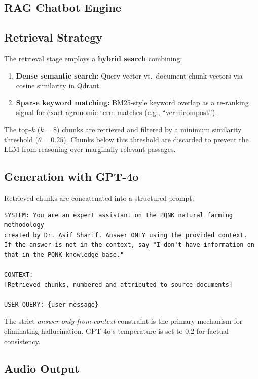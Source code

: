 \documentclass[12pt, a4paper]{article}
\begin{document}
\begin{onehalfspacing}
\section{RAG Chatbot Engine}

\subsection{Retrieval Strategy}

The retrieval stage employs a \textbf{hybrid search} combining:
\begin{enumerate}[noitemsep]
  \item \textbf{Dense semantic search:} Query vector vs.\ document chunk vectors
    via cosine similarity in Qdrant.
  \item \textbf{Sparse keyword matching:} BM25-style keyword overlap as a
    re-ranking signal for exact agronomic term matches (e.g., ``vermicompost'').
\end{enumerate}

The top-$k$ ($k=8$) chunks are retrieved and filtered by a minimum similarity
threshold ($\theta = 0.25$). Chunks below this threshold are discarded to prevent
the LLM from reasoning over marginally relevant passages.

\subsection{Generation with GPT-4o}

Retrieved chunks are concatenated into a structured prompt:

\begin{lstlisting}[caption={System prompt template for the PQNK RAG engine.}]
SYSTEM: You are an expert assistant on the PQNK natural farming methodology
created by Dr. Asif Sharif. Answer ONLY using the provided context.
If the answer is not in the context, say "I don't have information on
that in the PQNK knowledge base."

CONTEXT:
[Retrieved chunks, numbered and attributed to source documents]

USER QUERY: {user_message}
\end{lstlisting}

The strict \textit{answer-only-from-context} constraint is the primary mechanism
for eliminating hallucination. GPT-4o's temperature is set to 0.2 for factual
consistency.

\subsection{Audio Output}


\end{onehalfspacing}
\end{document}
